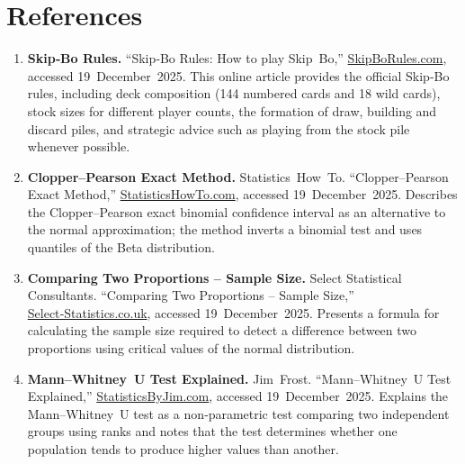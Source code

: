 \documentclass[11pt]{article}
\begin{document}
\section*{References}
%
\begin{enumerate}
\item\label{ref:skipbo}
\textbf{Skip‑Bo Rules.} “Skip‑Bo Rules: How to play Skip Bo,” \href{https://skipborules.com/}{SkipBoRules.com}, accessed 19 December 2025. This online article provides the official Skip‑Bo rules, including deck composition (144 numbered cards and 18 wild cards), stock sizes for different player counts, the formation of draw, building and discard piles, and strategic advice such as playing from the stock pile whenever possible.

\item\label{ref:clopperpearson}
\textbf{Clopper–Pearson Exact Method.} Statistics How To. “Clopper–Pearson Exact Method,” \href{https://www.statisticshowto.com/clopper-pearson-exact-method/}{StatisticsHowTo.com}, accessed 19 December 2025. Describes the Clopper–Pearson exact binomial confidence interval as an alternative to the normal approximation; the method inverts a binomial test and uses quantiles of the Beta distribution.

\item\label{ref:comparingproportions}
\textbf{Comparing Two Proportions – Sample Size.} Select Statistical Consultants. “Comparing Two Proportions – Sample Size,” \href{https://select-statistics.co.uk/calculators/sample-size-calculator-two-proportions/}{Select‑Statistics.co.uk}, accessed 19 December 2025. Presents a formula for calculating the sample size required to detect a difference between two proportions using critical values of the normal distribution.

\item\label{ref:mannwhitney}
\textbf{Mann–Whitney U Test Explained.} Jim Frost. “Mann–Whitney U Test Explained,” \href{https://statisticsbyjim.com/hypothesis-testing/mann-whitney-u-test/}{StatisticsByJim.com}, accessed 19 December 2025. Explains the Mann–Whitney U test as a non‑parametric test comparing two independent groups using ranks and notes that the test determines whether one population tends to produce higher values than another.


\end{enumerate}
\end{document}
